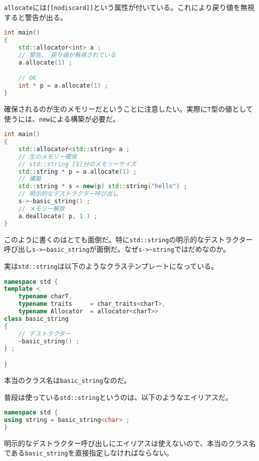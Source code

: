 \texttt{allocate}には\texttt{[[nodiscard]]}という属性が付いている。これにより戻り値を無視すると警告が出る。

\begin{lstlisting}[language={C++}]
int main()
{
    std::allocator<int> a ;
    // 警告、 戻り値が無視されている
    a.allocate(1) ;

    // OK
    int * p = a.allocate(1) ;
}
\end{lstlisting}

確保されるのが生のメモリーだということに注意したい。実際に\texttt{T}型の値として使うには、\texttt{new}による構築が必要だ。

\ifTombow\pagebreak\fi
\begin{lstlisting}[language={C++}]
int main()
{
    std::allocator<std::string> a ;
    // 生のメモリー確保
    // std::string [1]分のメモリーサイズ
    std::string * p = a.allocate(1) ;
    // 構築
    std::string * s = new(p) std::string("hello") ;
    // 明示的なデストラクター呼び出し
    s->~basic_string() ;
    // メモリー解放
    a.deallocate( p, 1 ) ;
}
\end{lstlisting}

このように書くのはとても面倒だ。特に\texttt{std::string}の明示的なデストラクター呼び出し\texttt{s->{\textasciitilde}basic\_string}が面倒だ。なぜ\texttt{s->{\textasciitilde}string}ではだめなのか。

実は\texttt{std::string}は以下のようなクラステンプレートになっている。

\begin{lstlisting}[language={C++}]
namespace std {
template <
    typename charT,
    typename traits     = char_traits<charT>,
    typename Allocator  = allocator<charT>>
class basic_string
{
    // デストラクター
    ~basic_string() ;
} ;

}
\end{lstlisting}

本当のクラス名は\texttt{basic\_string}なのだ。

普段は使っている\texttt{std::string}というのは、以下のようなエイリアスだ。

\begin{lstlisting}[language={C++}]
namespace std {
using string = basic_string<char> ;
}
\end{lstlisting}

明示的なデストラクター呼び出しにエイリアスは使えないので、本当のクラス名である\texttt{basic\_string}を直接指定しなければならない。

